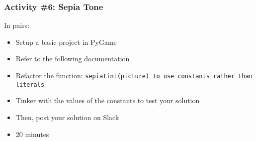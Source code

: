 \begin{frame}
	\frametitle{Activity \#6: Sepia Tone}
	
	In pairs:
	
	\vspace{2em}
	
	\begin{itemize}		
		\item Setup a basic project in PyGame
		\item Refer to the following documentation
		\item Refactor the function: \texttt{sepiaTint(picture) to use constants rather than literals}
		\item Tinker with the values of the constants to test your solution
		\item Then, post your solution on Slack
		\item 20 minutes
	\end{itemize}
\end{frame}


